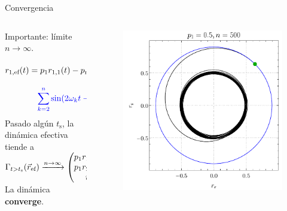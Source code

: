 \begin{frame}{Convergencia}
    \begin{columns}
        \begin{column}{0.5\textwidth}
            Importante: límite $n\rightarrow\infty$. \pause
            \begin{equation}
                \begin{gathered}
                r_{1,\ef}(t)=p_{1}r_{1,1}(t)-p_{\text{np}}r_{\text{np}}{\color{blue}\sum_{k=2}^{n}\sin(2\omega_{k} t-\phi)}\pause\\
                {\color{blue}\sum_{k=2}^{n}\sin(2\omega_{k} t-\phi)}\xrightarrow{n\rightarrow\infty} N(0,\text{std})
                \end{gathered}\nonumber
            \end{equation}\pause
            Pasado algún $t_{\text{s}}$, la dinámica efectiva tiende a\\ \pause
            $\Gamma_{t>t_{\text{s}}}(\vec{r}_{\text{ef}})\xrightarrow{n\rightarrow\infty}\begin{pmatrix}
                p_{1}r_{1,1}(t)\\
                p_{1}r_{2,1}(t)\\
                r_{3}\\
            \end{pmatrix}$\\ \pause
            La dinámica \textbf{converge}.
        \end{column}
        \pause
        \begin{column}{0.5\textwidth}
           \begin{figure}
            \centering
            \includegraphics[width=1.\textwidth]{figures/maxent_results/local_all_ran_p=0.5_r=0.9_n=500_a=-3_b=3.pdf}
           \end{figure}
        \end{column}
    \end{columns}
\end{frame}


